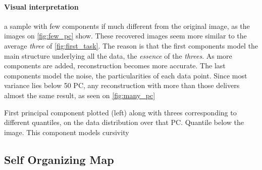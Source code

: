 \documentclass[a4paper, 10pt]{article}
\begin{document}
  

  \paragraph{Visual interpretation} a sample with few components 
  if much different from the original image, as the images on \autoref{fig:few_pc} 
  show. These recovered images seem more similar to the average \emph{three} of 
  \autoref{fig:first_task}. The reason is that the first components model the
  main structure underlying all the data, the \emph{essence} of the \emph{threes}.
  As more components are added, reconstruction becomes more accurate.  The last 
  components model the noise, the particularities of each data point. Since
  most variance lies below 50 PC, any reconstruction with more than those delivers
  almost the same result, as seen on \autoref{fig:many_pc}
  

    First principal component plotted (left) along with threes corresponding
      to different quantiles, on the data distribution over that PC. Quantile below
    the image. %
    This component models cursivity
  




  \subsection{Self Organizing Map}
  \Blindtext
\end{document}
